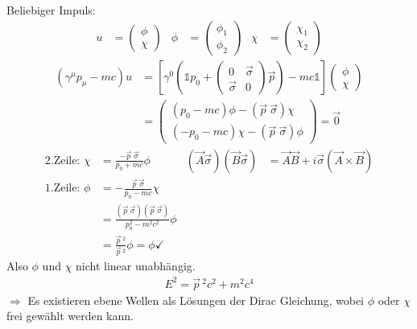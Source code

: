 Beliebiger Impuls:
	\begin{align*}
	u &= 
		\begin{pmatrix}
			\phi \\
			\chi
		\end{pmatrix} &
	\phi &= 
		\begin{pmatrix}
		\phi_1 \\
		\phi_2
		\end{pmatrix} &
	\chi &= 
		\begin{pmatrix}
		\chi_1 \\
		\chi_2
		\end{pmatrix}
	\end{align*}
	\begin{align*}
		\left( \gamma^\mu p_\mu - mc\right) u
		&=\left[
			\gamma^0 \left(
				\mathds{1} p_0 +
					\begin{pmatrix}
						0 & \vec{\sigma} \\
						\vec{\sigma} & 0
					\end{pmatrix} \vec{p}
				\right)
			-mc \mathds{1}
		\right]
		\begin{pmatrix}
			\phi \\
			\chi
		\end{pmatrix} \\
		&= \begin{pmatrix}
			(p_0 -mc) \phi - (\vec{p} ~\vec{\sigma}) \chi \\
			(-p_0 -mc) \chi - (\vec{p} ~\vec{\sigma}) \phi
		\end{pmatrix}
		= \vec{0}
	\end{align*}
	\begin{align*}
		\text{2.Zeile: }
		\chi &= \frac{- \vec{p}~\vec{\sigma}}{p_0 +mc} \phi 
		& (\vec{A}\vec{\sigma})(\vec{B}\vec{\sigma}) &=
		\vec{A}\vec{B}+ i \vec{\sigma} (\vec{A} \times \vec{B}) \\
		\text{1.Zeile: } 
		\phi &= - \frac{\vec{p}~\vec{\sigma}}{p_0 - mc} \chi \\
		&= \frac{(\vec{p}~\vec{\sigma})(\vec{p}~\vec{\sigma})}{p_0^2-m^2c^2} \phi \\
		&= \frac{\vec{p}\,^2}{\vec{p}\,^2}\phi = \phi \checkmark
	\end{align*}
Also $\phi$ und $\chi$ nicht linear unabhängig.
	\begin{align*}
		\boxed{E^2 = \vec{p}\,^2c^2 + m^2 c^4}
	\end{align*}
$\Rightarrow$ Es existieren ebene Wellen als Lösungen der Dirac Gleichung, wobei $\phi$ oder $\chi$ frei gewählt werden kann.

